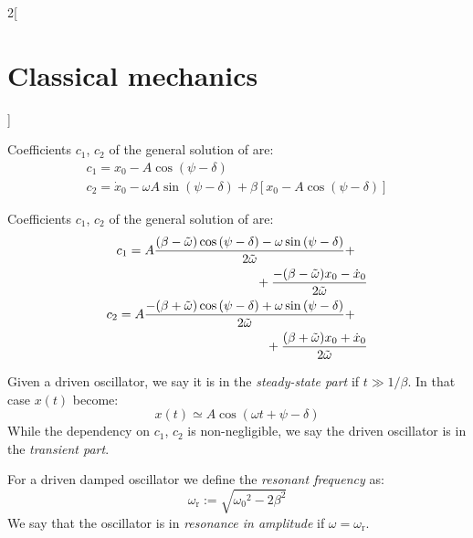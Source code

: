 \documentclass[../../../main_physics.tex]{subfiles}
\begin{document}
\begin{multicols}{2}[\section{Classical mechanics}]
\begin{proposition}
  \end{proposition}
  \begin{proposition}
    Coefficients $c_1$, $c_2$ of the general solution of  are:
    \begin{gather*}
      c_1=x_0-A\cos\left(\psi-\delta\right)\\
      c_2=\dot{x}_0-\omega A\sin\left(\psi-\delta\right)+\beta\left[x_0-A\cos\left(\psi-\delta\right)\right]
    \end{gather*}
  \end{proposition}
  \begin{proposition}
    Coefficients $c_1$, $c_2$ of the general solution of  are:
    \begin{equation*}
      \begin{split}
        \begin{multlined}[t]
          c_1=A\frac{(\beta-\Tilde{\omega})\cos\left(\psi-\delta\right)-\omega\sin\left(\psi-\delta\right)}{2\Tilde{\omega}}+\\+\frac{-(\beta-\Tilde{\omega})x_0-\dot{x}_0}{2\Tilde{\omega}}
        \end{multlined}\\
        \begin{multlined}[t]
          c_2=A\frac{-(\beta+\Tilde{\omega})\cos\left(\psi-\delta\right)+\omega\sin\left(\psi-\delta\right)}{2\Tilde{\omega}}+\\+\frac{(\beta+\Tilde{\omega})x_0+\dot{x}_0}{2\Tilde{\omega}}
        \end{multlined}
      \end{split}
    \end{equation*}
  \end{proposition}
  \begin{definition}
    Given a driven oscillator, we say it is in the \emph{steady-state part} if $t\gg 1/\beta$. In that case $x(t)$ become: $$x(t)\simeq A\cos(\omega t+\psi-\delta)$$ While the dependency on $c_1$, $c_2$ is non-negligible, we say the driven oscillator is in the \emph{transient part}.
  \end{definition}
  \begin{definition}
    For a driven damped oscillator we define the \emph{resonant frequency} as: $$\omega_\text{r}:=\sqrt{{\omega_0}^2-2\beta^2}$$ We say that the oscillator is in \emph{resonance in amplitude} if $\omega=\omega_\text{r}$.
  \end{definition}
  \begin{proposition}

\end{proposition}
\end{multicols}
\end{document}
